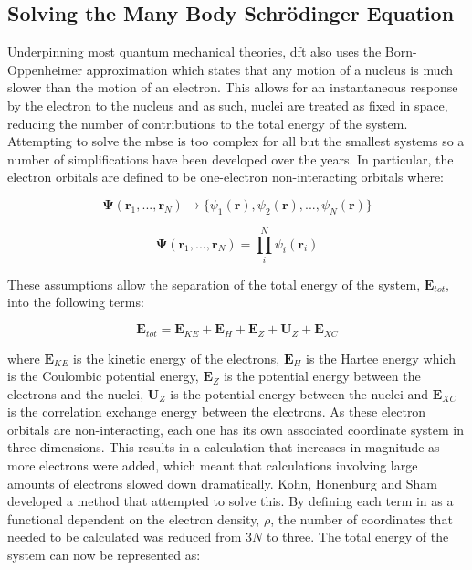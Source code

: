 \subsection{Solving the Many Body Schr\"{o}dinger Equation}
Underpinning most quantum mechanical theories, \acrshort{dft} also uses the Born\nobreakdash-Oppenheimer approximation which states that any motion of a nucleus is much slower than the motion of an electron. This allows for an instantaneous response by the electron to the nucleus and as such, nuclei are treated as fixed in space, reducing the number of contributions to the total energy of the system. Attempting to solve the \acrshort{mbse} is too complex for all but the smallest systems so a number of simplifications have been developed over the years. In particular, the electron orbitals are defined to be one-electron non-interacting orbitals where:

\begin{equation}
\boldsymbol{\Psi} (\mathbf{r}_1, ..., \mathbf{r}_N) \xrightarrow{} \{\psi_1(\mathbf{r}),  \psi_2(\mathbf{r}), ..., \psi_N(\mathbf{r})\}
\end{equation}

\begin{equation}
\boldsymbol{\Psi}(\mathbf{r}_1, ..., \mathbf{r}_N) = \prod_i^N \psi_i (\mathbf{r}_i)
\end{equation}

These assumptions allow the separation of the total energy of the system, \(\boldsymbol{E}_{tot}\), into the following terms:

\begin{equation}
\boldsymbol{E}_{tot} = \boldsymbol{E}_{KE} + \boldsymbol{E}_{H} + \boldsymbol{E}_{Z} + \boldsymbol{U}_{Z} + \boldsymbol{E}_{XC} 
\label{eqn:GSComponents}
\end{equation}

where \(\boldsymbol{E}_{KE}\) is the kinetic energy of the electrons, \(\boldsymbol{E}_{H}\) is the Hartee energy which is the Coulombic potential energy, \(\boldsymbol{E}_{Z}\) is the potential energy between the electrons and the nuclei, \(\boldsymbol{U}_{Z}\) is the potential energy between the nuclei and \(\boldsymbol{E}_{XC}\) is the correlation exchange energy between the electrons. As these electron orbitals are non-interacting, each one has its own associated coordinate system in three dimensions. This results in a calculation that increases in magnitude as more electrons were added, which meant that calculations involving large amounts of electrons slowed down dramatically. Kohn, Honenburg and Sham \cite{Kohn1965, Hohenberg1964} developed a method that attempted to solve this. By defining each term in  as a functional dependent on the electron density, \(\rho\), the number of coordinates that needed to be calculated was reduced from \(3N\) to three. The total energy of the system can now be represented as:

